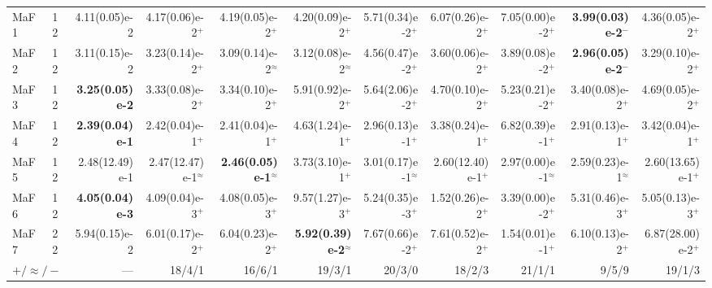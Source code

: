 \begin{longtable}{llrrrrrrrrr}
\midrule
MaF1 & 12 & 4.11(0.05)e-2 & 4.17(0.06)e-2$^{+}$ & 4.19(0.05)e-2$^{+}$ & 4.20(0.09)e-2$^{+}$ & 5.71(0.34)e-2$^{+}$ & 6.07(0.26)e-2$^{+}$ & 7.05(0.00)e-2$^{+}$ & \textbf{3.99(0.03)e-2}$^{-}$ & 4.36(0.05)e-2$^{+}$ \\
MaF2 & 12 & 3.11(0.15)e-2 & 3.23(0.14)e-2$^{+}$ & 3.09(0.14)e-2$^{\approx}$ & 3.12(0.08)e-2$^{\approx}$ & 4.56(0.47)e-2$^{+}$ & 3.60(0.06)e-2$^{+}$ & 3.89(0.08)e-2$^{+}$ & \textbf{2.96(0.05)e-2}$^{-}$ & 3.29(0.10)e-2$^{+}$ \\
MaF3 & 12 & \textbf{3.25(0.05)e-2} & 3.33(0.08)e-2$^{+}$ & 3.34(0.10)e-2$^{+}$ & 5.91(0.92)e-2$^{+}$ & 5.64(2.06)e-2$^{+}$ & 4.70(0.10)e-2$^{+}$ & 5.23(0.21)e-2$^{+}$ & 3.40(0.08)e-2$^{+}$ & 4.69(0.05)e-2$^{+}$ \\
MaF4 & 12 & \textbf{2.39(0.04)e-1} & 2.42(0.04)e-1$^{+}$ & 2.41(0.04)e-1$^{+}$ & 4.63(1.24)e-1$^{+}$ & 2.96(0.13)e-1$^{+}$ & 3.38(0.24)e-1$^{+}$ & 6.82(0.39)e-1$^{+}$ & 2.91(0.13)e-1$^{+}$ & 3.42(0.04)e-1$^{+}$ \\
MaF5 & 12 & 2.48(12.49)e-1 & 2.47(12.47)e-1$^{\approx}$ & \textbf{2.46(0.05)e-1}$^{\approx}$ & 3.73(3.10)e-1$^{+}$ & 3.01(0.17)e-1$^{\approx}$ & 2.60(12.40)e-1$^{+}$ & 2.97(0.00)e-1$^{\approx}$ & 2.59(0.23)e-1$^{\approx}$ & 2.60(13.65)e-1$^{+}$ \\
MaF6 & 12 & \textbf{4.05(0.04)e-3} & 4.09(0.04)e-3$^{+}$ & 4.08(0.05)e-3$^{+}$ & 9.57(1.27)e-3$^{+}$ & 5.24(0.35)e-3$^{+}$ & 1.52(0.26)e-2$^{+}$ & 3.39(0.00)e-2$^{+}$ & 5.31(0.46)e-3$^{+}$ & 5.05(0.13)e-3$^{+}$ \\
MaF7 & 22 & 5.94(0.15)e-2 & 6.01(0.17)e-2$^{+}$ & 6.04(0.23)e-2$^{+}$ & \textbf{5.92(0.39)e-2}$^{\approx}$ & 7.67(0.66)e-2$^{+}$ & 7.61(0.52)e-2$^{+}$ & 1.54(0.01)e-1$^{+}$ & 6.10(0.13)e-2$^{+}$ & 6.87(28.00)e-2$^{+}$ \\
\midrule
\multicolumn{2}{l}{$+/\approx/-$} & --- & 18/4/1 & 16/6/1 & 19/3/1 & 20/3/0 & 18/2/3 & 21/1/1 & 9/5/9 & 19/1/3 \\
\end{longtable}